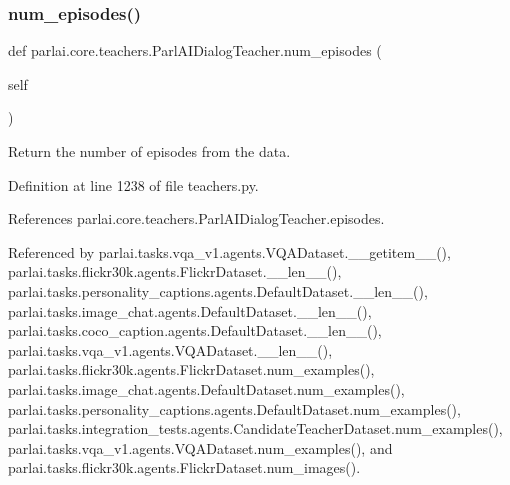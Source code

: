 \subsubsection{\texorpdfstring{num\+\_\+episodes()}{num\_episodes()}}
{\footnotesize\ttfamily def parlai.\+core.\+teachers.\+Parl\+A\+I\+Dialog\+Teacher.\+num\+\_\+episodes (\begin{DoxyParamCaption}\item[{}]{self }\end{DoxyParamCaption})}

\begin{DoxyVerb}Return the number of episodes from the data.\end{DoxyVerb}
 

Definition at line 1238 of file teachers.\+py.



References parlai.\+core.\+teachers.\+Parl\+A\+I\+Dialog\+Teacher.\+episodes.



Referenced by parlai.\+tasks.\+vqa\+\_\+v1.\+agents.\+V\+Q\+A\+Dataset.\+\_\+\+\_\+getitem\+\_\+\+\_\+(), parlai.\+tasks.\+flickr30k.\+agents.\+Flickr\+Dataset.\+\_\+\+\_\+len\+\_\+\+\_\+(), parlai.\+tasks.\+personality\+\_\+captions.\+agents.\+Default\+Dataset.\+\_\+\+\_\+len\+\_\+\+\_\+(), parlai.\+tasks.\+image\+\_\+chat.\+agents.\+Default\+Dataset.\+\_\+\+\_\+len\+\_\+\+\_\+(), parlai.\+tasks.\+coco\+\_\+caption.\+agents.\+Default\+Dataset.\+\_\+\+\_\+len\+\_\+\+\_\+(), parlai.\+tasks.\+vqa\+\_\+v1.\+agents.\+V\+Q\+A\+Dataset.\+\_\+\+\_\+len\+\_\+\+\_\+(), parlai.\+tasks.\+flickr30k.\+agents.\+Flickr\+Dataset.\+num\+\_\+examples(), parlai.\+tasks.\+image\+\_\+chat.\+agents.\+Default\+Dataset.\+num\+\_\+examples(), parlai.\+tasks.\+personality\+\_\+captions.\+agents.\+Default\+Dataset.\+num\+\_\+examples(), parlai.\+tasks.\+integration\+\_\+tests.\+agents.\+Candidate\+Teacher\+Dataset.\+num\+\_\+examples(), parlai.\+tasks.\+vqa\+\_\+v1.\+agents.\+V\+Q\+A\+Dataset.\+num\+\_\+examples(), and parlai.\+tasks.\+flickr30k.\+agents.\+Flickr\+Dataset.\+num\+\_\+images().

